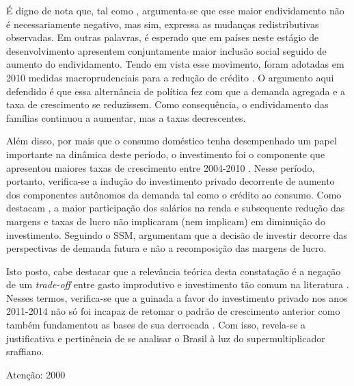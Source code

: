 É digno de nota que, tal como \textcite{dos_santos_notas_2013}, argumenta-se que esse maior endividamento não é necessariamente negativo, mas sim, expressa as mudanças redistributivas observadas. Em outras palavras, é esperado que em países neste estágio de desenvolvimento apresentem conjuntamente maior inclusão social seguido de aumento do endividamento.
Tendo em vista esse movimento, foram adotadas em 2010 medidas macroprudenciais para a redução de crédito \cite{ribeiro_o_2016}. O argumento aqui defendido é que essa alternância de política fez com que a demanda agregada e a taxa de crescimento se reduzissem. Como consequência, o endividamento das famílias continuou a aumentar, mas a taxas decrescentes.




Além disso, por mais que o consumo doméstico tenha desempenhado um papel importante na dinâmica deste período, o investimento foi o componente que apresentou maiores taxas de crescimento entre 2004-2010 \cite{dos_santos_notas_2013}. Nesse período, portanto, verifica-se a indução do investimento privado decorrente de aumento dos componentes autônomos da demanda tal como o crédito ao consumo.
Como destacam \textcite{serrano_conflito_2018}, a maior participação dos salários na renda e subsequente redução das margens e taxas de lucro não implicaram (nem implicam) em diminuição do investimento. Seguindo o SSM, argumentam que a decisão de investir decorre das perspectivas de demanda futura e não a recomposição das margens de lucro. 


Isto posto, cabe destacar que a
relevância teórica desta constatação é a negação de um \textit{trade-off} entre gasto improdutivo e investimento tão comum na literatura \cite{serrano_acumulacao_2001}. 
Nesses termos, verifica-se que a guinada a favor do investimento privado nos anos 2011-2014 não só foi incapaz de retomar o padrão de crescimento anterior como também fundamentou as bases de sua derrocada \cite{serrano_demanda_2015}. Com isso, revela-se a justificativa e pertinência de se analisar o Brasil à luz do supermultiplicador sraffiano.


{\color{blue} Atenção: 2000}

